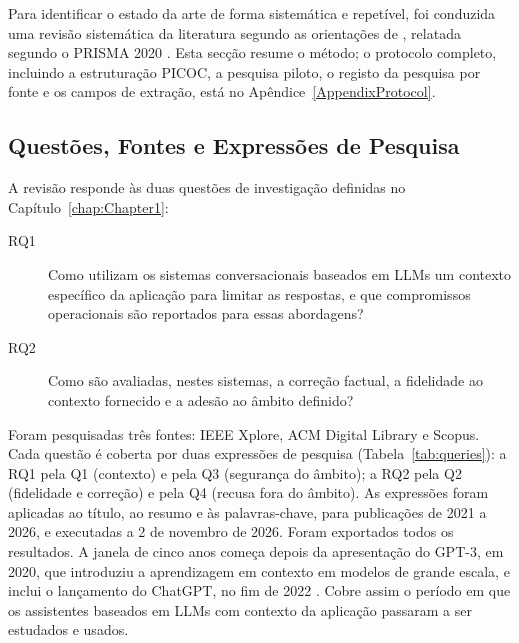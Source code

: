 Para identificar o estado da arte de forma sistemática e repetível, foi conduzida uma revisão sistemática da literatura segundo as orientações de \textcite{kitchenham2007guidelines}, relatada segundo o \gls{PRISMA} 2020 \parencite{page2021prisma}. Esta secção resume o método; o protocolo completo, incluindo a estruturação \gls{PICOC}, a pesquisa piloto, o registo da pesquisa por fonte e os campos de extração, está no Apêndice~\ref{AppendixProtocol}.

\subsection{Questões, Fontes e Expressões de Pesquisa}
\label{sec:chap2_rqs}
\label{sec:chap2_search}

A revisão responde às duas questões de investigação definidas no Capítulo~\ref{chap:Chapter1}:
\begin{description}
    \item[RQ1] Como utilizam os sistemas conversacionais baseados em \glspl{LLM} um contexto específico da aplicação para limitar as respostas, e que compromissos operacionais são reportados para essas abordagens?
    \item[RQ2] Como são avaliadas, nestes sistemas, a correção factual, a fidelidade ao contexto fornecido e a adesão ao âmbito definido?
\end{description}

Foram pesquisadas três fontes: IEEE Xplore, ACM Digital Library e Scopus. %
Cada questão é coberta por duas expressões de pesquisa (Tabela~\ref{tab:queries}): a RQ1 pela Q1 (contexto) e pela Q3 (segurança do âmbito); a RQ2 pela Q2 (fidelidade e correção) e pela Q4 (recusa fora do âmbito). As expressões foram aplicadas ao título, ao resumo e às palavras-chave, para publicações de 2021 a 2026, e executadas a 2 de novembro de 2026. Foram exportados todos os resultados. A janela de cinco anos começa depois da apresentação do GPT-3, em 2020, que introduziu a aprendizagem em contexto em modelos de grande escala, e inclui o lançamento do ChatGPT, no fim de 2022 \parencite{wu2023brief}. Cobre assim o período em que os assistentes baseados em \glspl{LLM} com contexto da aplicação passaram a ser estudados e usados.

